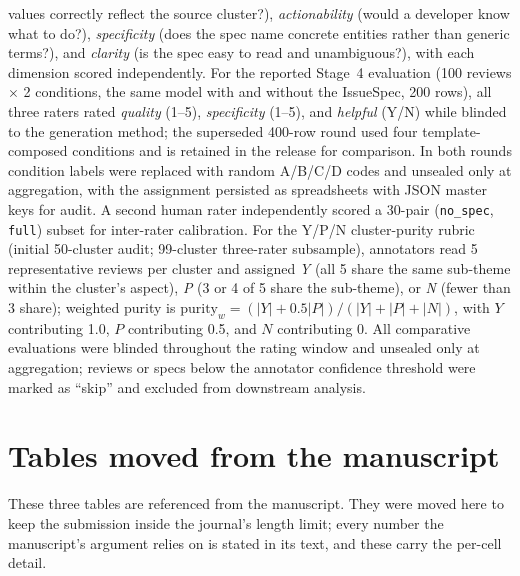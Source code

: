 \documentclass[11pt]{article}
\begin{document}
  values correctly reflect the source cluster?), \emph{actionability} (would a developer know
  what to do?), \emph{specificity} (does the spec name concrete entities rather than generic
  terms?), and \emph{clarity} (is the spec easy to read and unambiguous?), with each dimension
  scored independently. For the reported Stage~4 evaluation (100 reviews $\times$ 2 conditions,
  the same model with and without the IssueSpec, 200 rows), all three raters rated
  \emph{quality} (1--5), \emph{specificity} (1--5), and \emph{helpful} (Y/N) while blinded to
  the generation method; the superseded 400-row round used four template-composed conditions and
  is retained in the release for comparison. In both rounds condition labels were replaced with random A/B/C/D codes and unsealed
  only at aggregation, with the assignment persisted as spreadsheets with JSON master keys for
  audit. A second human rater independently scored a 30-pair (\texttt{no\_spec}, \texttt{full})
  subset for inter-rater calibration. For the Y/P/N cluster-purity rubric (initial 50-cluster
  audit; 99-cluster three-rater subsample), annotators read 5 representative reviews per cluster
   and assigned \emph{Y} (all 5 share the same sub-theme within the cluster's aspect), \emph{P}
  (3 or 4 of 5 share the sub-theme), or \emph{N} (fewer than 3 share); weighted purity is
  $\mathrm{purity}_w = (|Y| + 0.5|P|)/(|Y|+|P|+|N|)$, with $Y$ contributing 1.0, $P$
  contributing 0.5, and $N$ contributing 0. All comparative evaluations were blinded throughout
  the rating window and unsealed only at aggregation; reviews or specs below the annotator
  confidence threshold were marked as ``skip'' and excluded from downstream analysis.


\section{Tables moved from the manuscript}
These three tables are referenced from the manuscript. They were moved here to keep the
submission inside the journal's length limit; every number the manuscript's argument
relies on is stated in its text, and these carry the per-cell detail.
\end{document}
